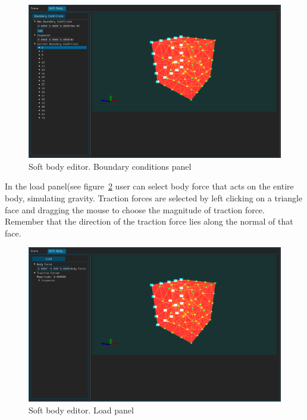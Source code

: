 \documentclass[en]{minipw} %
\begin{document}
\begin{figure}[h!]
\centering
\includegraphics[scale=0.3]{pictures/ifx/ifx_bc.png}
\caption[Soft body editor. Boundary conditions panel]{Soft body editor. Boundary conditions panel}
\label{fig:ifx_bc}
\end{figure}

In the load panel(see figure~\ref{fig:ifx_load} user can select body force that acts on the entire body, simulating gravity. Traction forces are selected by left clicking on a triangle face and dragging the mouse to choose the magnitude of traction force. Remember that the direction of the traction force lies along the normal of that face.

\begin{figure}[h!]
\centering
\includegraphics[scale=0.3]{pictures/ifx/ifx_load.png}
\caption[Soft body editor. Load panel]{Soft body editor. Load panel}
\label{fig:ifx_load}
\end{figure}
\end{document}
